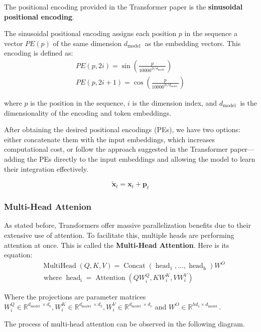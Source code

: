 The positional encoding provided in the Transformer paper is the \textbf{sinusoidal positional encoding}.

The sinusoidal positional encoding assigns each position $p$ in the sequence a vector $P E(p)$ of the same dimension $d_{\text {model }}$ as the embedding vectors. This encoding is defined as:
$$
\begin{gathered}
P E(p, 2 i)=\sin \left(\frac{p}{10000^{2 i / d_{\text {model }}}}\right) \\
P E(p, 2 i+1)=\cos \left(\frac{p}{10000^{2 i / d_{\text {model }}}}\right)
\end{gathered}
$$

where $p$ is the position in the sequence, $i$ is the dimension index, and $d_{\text {model }}$ is the dimensionality of the encoding and token embeddings.

After obtaining the desired positional encodings (PEs), we have two options: either concatenate them with the input embeddings, which increases computational cost, or follow the approach suggested in the Transformer paper—adding the PEs directly to the input embeddings and allowing the model to learn their integration effectively.

$$
\tilde{\mathbf{x}}_t=\mathbf{x}_t+\mathbf{p}_t
$$

\subsubsection{Multi-Head Attenion}
As stated before, Transformers offer massive parallelization benefits due to their extensive use of attention. To facilitate this, multiple heads are performing attention at once. This is called the \textbf{Multi-Head Attention}. Here is its equation:
$$
\begin{aligned}
& \operatorname{MultiHead}(Q, K, V)=\operatorname{Concat}\left(\operatorname{head}_1, \ldots, \operatorname{ head}_{\mathrm{h}}\right) W^O \\
& \text { where } \operatorname { head}_{\mathrm{i}}=\operatorname{Attention}\left(Q W_i^Q, K W_i^K, V W_i^V\right)
\end{aligned}
$$


Where the projections are parameter matrices $W_i^Q \in \mathbb{R}^{d_{\text {model }} \times d_k}, W_i^K \in \mathbb{R}^{d_{\text {model }} \times d_k}, W_i^V \in \mathbb{R}^{d_{\text {model }} \times d_v}$ and $W^O \in \mathbb{R}^{h d_v \times d_{\text {model }}}$.

The process of multi-head attention can be observed in the following diagram.

